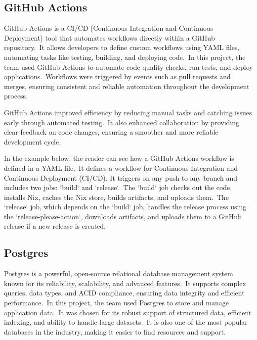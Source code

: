 \subsection{GitHub Actions}\label{subsec:github-actions}

GitHub Actions is a CI/CD (Continuous Integration and Continuous Deployment) tool that automates workflows directly within a GitHub repository.\ It allows developers to define custom workflows using YAML files, automating tasks like testing, building, and deploying code.\ In this project, the team used GitHub Actions to automate code quality checks, run tests, and deploy applications.\ Workflows were triggered by events such as pull requests and merges, ensuring consistent and reliable automation throughout the development process.\cite[GitHub Actions]{githubActions}

GitHub Actions improved efficiency by reducing manual tasks and catching issues early through automated testing.\ It also enhanced collaboration by providing clear feedback on code changes, ensuring a smoother and more reliable development cycle.

In the example below, the reader can see how a GitHub Actions workflow is defined in a YAML file.\ It defines a workflow for Continuous Integration and Continuous Deployment (CI/CD). It triggers on any push to any branch and includes two jobs: `build` and `release`.\ The `build` job checks out the code, installs Nix, caches the Nix store, builds artifacts, and uploads them.\ The `release` job, which depends on the `build` job, handles the release process using the `release-please-action`, downloads artifacts, and uploads them to a GitHub release if a new release is created.



\subsection{Postgres}\label{subsec:postgres}

Postgres is a powerful, open-source relational database management system known for its reliability, scalability, and advanced features.\ It supports complex queries, data types, and ACID compliance, ensuring data integrity and efficient performance.\ In this project, the team used Postgres to store and manage application data.\ It was chosen for its robust support of structured data, efficient indexing, and ability to handle large datasets.\ It is also one of the most popular databases in the industry, making it easier to find resources and support.\cite[Postgres]{postgres}


